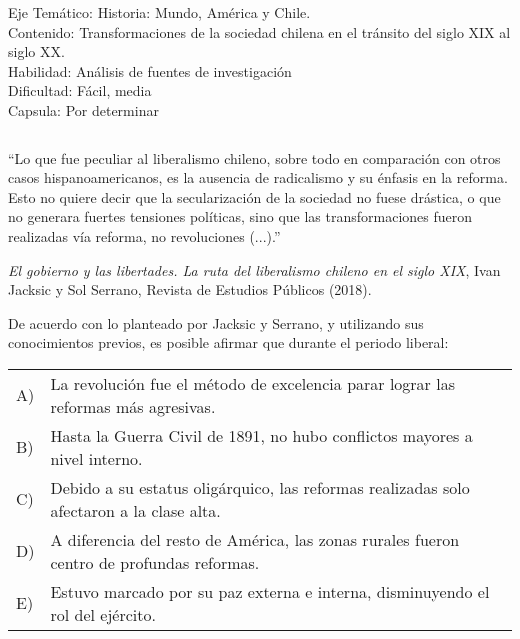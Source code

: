\documentclass[letterpaper,11pt]{article}
\newcommand{\anchopregunta}{0.9\textwidth}
\begin{document}
\begin{enumerate}
\begin{minipage}{\anchopregunta}
\begin{info} %
\begin{flushleft}
Eje Temático: Historia: Mundo, América y Chile.\\
Contenido: Transformaciones de la sociedad chilena en el tránsito del siglo XIX al siglo XX.\\
Habilidad: Análisis de fuentes de investigación\\
Dificultad: Fácil, media\\
Capsula: Por determinar \\
\end{flushleft} 
\end{info}
\end{minipage}\vfill$\;$ %

\begin{minipage}{\anchopregunta}
\item ``Lo que fue peculiar al liberalismo chileno, sobre todo en comparación con otros casos hispanoamericanos, es la ausencia de radicalismo y su énfasis en la reforma. Esto no quiere decir que la secularización de la sociedad no fuese drástica, o que no generara fuertes tensiones políticas, sino que las transformaciones fueron realizadas vía reforma, no revoluciones (...).''
\begin{flushright}
\textit{El gobierno y las libertades. La ruta del liberalismo chileno en el siglo XIX}, Ivan Jacksic y Sol Serrano, Revista de Estudios Públicos (2018).
\end{flushright}
De acuerdo con lo planteado por Jacksic y Serrano, y utilizando sus conocimientos previos, es posible afirmar que durante el periodo liberal: 
\begin{flushleft}\begin{tabular}{@{\hspace{-.001\textwidth}}l@{\hspace{2pt}}p{}}
A)& La revolución fue el método de excelencia parar lograr las reformas más agresivas.\\
B)& Hasta la Guerra Civil de 1891, no hubo conflictos mayores a nivel interno.\\
C)& Debido a su estatus oligárquico, las reformas realizadas solo afectaron a la clase alta.\\
D)& A diferencia del resto de América, las zonas rurales fueron centro de profundas reformas.\\
E)& Estuvo marcado por su paz externa e interna, disminuyendo el rol del ejército.\\ 

\end{tabular}
\end{flushleft}
\end{minipage}
\end{enumerate}
\end{document}

